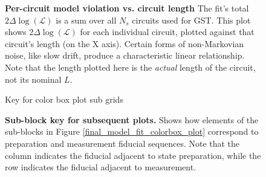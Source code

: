 \documentclass{article}[11pt]
\newcommand{\putfield}[2]{#2}
\begin{document}
{{\begin{figure}
  \begin{center}
    \begin{adjustbox}{max width=\textwidth}
      \putfield{final_model_fit_colorscatter_plot}{}
    \end{adjustbox}
    \caption{\textbf{Per-circuit model violation vs. circuit length} The fit's total $2\Delta\log(\mathcal{L})$ is a sum over all $N_s$ circuits used for GST.  This plot shows $2\Delta\log(\mathcal{L})$ for each individual circuit, plotted against that circuit's length (on the X axis).  Certain forms of non-Markovian noise, like slow drift, produce a characteristic linear relationship.  Note that the length plotted here is the \emph{actual} length of the circuit, not its nominal $L$.}
  \end{center}
\end{figure}


\begin{figure}
  \begin{center}
    \begin{adjustbox}{max width=\textwidth}
      \putfield{color_boxplot_key_plot}{Key for color box plot sub grids}
    \end{adjustbox}
    \caption{\textbf{Sub-block key for subsequent plots.} Shows how elements of the sub-blocks in Figure \ref{final_model_fit_colorbox_plot} correspond to preparation and measurement fiducial sequences.  Note that the column indicates the fiducial adjacent to state preparation, while the row indicates the fiducial adjacent to measurement.\label{color_boxplot_key_plot}}
  \end{center}
\end{figure}


}}
\end{document}

